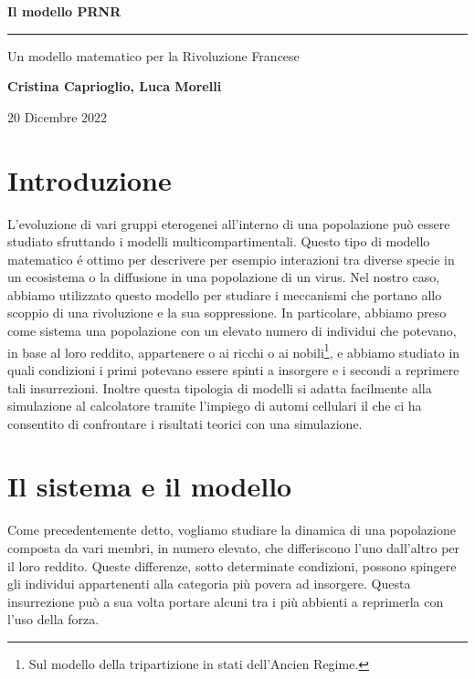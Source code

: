 \begin{center}
	\huge \textbf{Il modello PRNR}
	
	\rule{7cm}{0.4pt} 
	
	\LARGE Un modello matematico per la Rivoluzione Francese
	
	\vspace{20pt}
	
	\LARGE \textbf{Cristina Caprioglio, Luca Morelli}
	
	\vspace{5pt}
	
	\LARGE 20 Dicembre 2022
	
	\vspace{20pt}
 
	\normalsize
\end{center}  
\section*{Introduzione}
L'evoluzione di vari gruppi eterogenei all'interno di una popolazione può essere studiato sfruttando i modelli multicompartimentali. Questo tipo di modello matematico é ottimo per descrivere per esempio interazioni tra diverse specie in un ecosistema o la diffusione in una popolazione di un virus. Nel nostro caso, abbiamo utilizzato questo modello per studiare i meccanismi che portano allo scoppio di una rivoluzione e la sua soppressione. In particolare, abbiamo preso come sistema una popolazione con un elevato numero di individui che potevano, in base al loro reddito, appartenere o ai ricchi o ai nobili\footnote{Sul modello della tripartizione in stati dell'Ancien Regime.}, e abbiamo studiato in quali condizioni i primi potevano essere spinti a insorgere e i secondi a reprimere tali insurrezioni. Inoltre questa tipologia di modelli si adatta facilmente alla simulazione al calcolatore tramite l'impiego di automi cellulari il che ci ha consentito di confrontare i risultati teorici con una simulazione.
\section{Il sistema e il modello} \label{sistema modello}
Come precedentemente detto, vogliamo studiare la dinamica di una popolazione composta da vari membri, in numero elevato, che differiscono l'uno dall'altro per il loro reddito. Queste differenze, sotto determinate condizioni, possono spingere gli individui appartenenti alla categoria più povera ad insorgere. Questa insurrezione può a sua volta portare alcuni tra i più abbienti a reprimerla con l'uso della forza.\\

